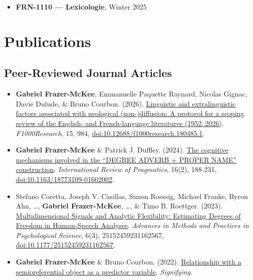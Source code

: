 \documentclass[
  canadian,
  10pt,
  letterpaper,
]{article}
\providecommand{\tightlist}{%
  \setlength{\itemsep}{0pt}\setlength{\parskip}{0pt}}
\begin{document}
\begin{itemize}
\tightlist
\item
  \textbf{FRN-1110 --- Lexicologie}, Winter 2025
\end{itemize}

\section{Publications}\label{publications}

\subsection{Peer-Reviewed Journal
Articles}\label{peer-reviewed-journal-articles}

\begin{itemize}
\tightlist
\item
  \textbf{Gabriel Frazer-McKee}, Emmanuelle Paquette Raynard, Nicolas
  Gignac, Davie Dulude, \& Bruno Courbon. (2026).
  \href{https://f1000research.com/articles/15-984}{Linguistic and
  extralinguistic factors associated with neological (non-)diffusion: A
  protocol for a scoping review of the English- and French-language
  literatures (1952--2026)}. \emph{F1000Research}, 15, 984,
  \href{https://doi.org/10.12688/f1000research.180485.1}{doi:10.12688/f1000research.180485.1}.
\item
  \textbf{Gabriel Frazer-McKee} \& Patrick J. Duffley. (2024).
  \href{https://doi.org/10.1163/18773109-01602002}{The cognitive
  mechanisms involved in the ``DEGREE ADVERB + PROPER NAME''
  construction}. \emph{International Review of Pragmatics}, 16(2),
  188-231,
  \href{https://doi.org/10.1163/18773109-01602002}{doi:10.1163/18773109-01602002}.
\item
  Stefano Coretta, Joseph V. Casillas, Simon Roessig, Michael Franke,
  Byron Ahn, \ldots, \textbf{Gabriel Frazer-McKee}, \ldots, \& Timo B.
  Roettger. (2023).
  \href{https://doi.org/10.1177/25152459231162567}{Multidimensional
  Signals and Analytic Flexibility: Estimating Degrees of Freedom in
  Human-Speech Analyses}. \emph{Advances in Methods and Practices in
  Psychological Science}, 6(3), 25152459231162567,
  \href{https://doi.org/10.1177/25152459231162567}{doi:10.1177/25152459231162567}.
\item
  \textbf{Gabriel Frazer-McKee} \& Bruno Courbon. (2022).
  \href{https://revues.polen.uca.fr/index.php/Signifiances/article/view/314}{Relationship
  with a semioreferential object as a predictor variable}.
  \emph{Signifying}.
\end{itemize}
\end{document}
